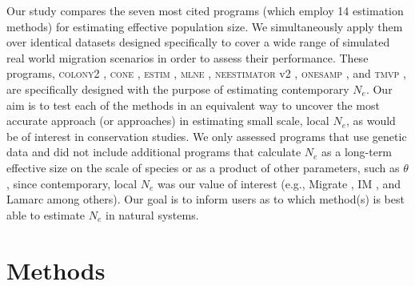 Our study compares the seven most cited programs (which employ 14 estimation methods) for 
estimating effective population size. We simultaneously apply them over identical datasets 
designed specifically to cover a wide range of simulated real world migration scenarios in 
order to assess their performance. These programs, \textsc{colony2} \citep{Wang:2009}, \textsc{cone} \citep{Anderson:2005}, 
\textsc{estim} \citep{Vitalis:2001c}, \textsc{mlne} \citep{Wang:2003}, 
\textsc{neestimator} v2 \citep{Do:2014}, \textsc{onesamp} \citep{Tallmon:2008}, and 
\textsc{tmvp} \citep{Beaumont:2003}, are specifically designed with the purpose of estimating 
contemporary $N_e$. Our aim is to test each of the methods in an equivalent way 
to uncover the most accurate approach (or approaches) in estimating small scale, local 
$N_e$, as would be of interest in conservation studies. We only assessed programs 
that use genetic data and did not include additional programs that calculate $N_e$ 
as a long-term effective size on the scale of species or as a product of other parameters, 
such as $\theta$, since contemporary, local $N_e$ was our value of interest 
(e.g., Migrate \citep{Beerli:2001}, IM \citep{Hey:2004}, and Lamarc \citep{Kuhner:2006} among others). 
Our goal is to inform users as to which method(s) is best able to estimate $N_e$ in natural systems.

\section{Methods}
